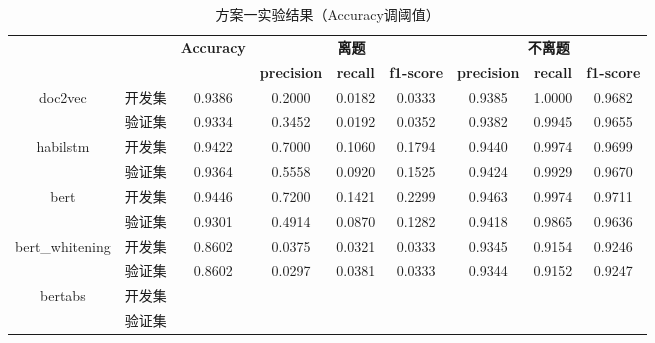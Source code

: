 \documentclass[11pt]{article}
\begin{document}
\begin{CJK}{UTF8}{gkai}
\begin{table}[htbp]\small
  \centering
  \begin{tabular}{cc|ccccccc}
    \hline
    \multicolumn{2}{c}{\multirow{2}[0]{*}{\textcolor[rgb]{ 1,  0,  0}{}}} & \multirow{2}[0]{*}{\textbf{Accuracy}} & \multicolumn{3}{c}{\textbf{离题}} & \multicolumn{3}{c}{\textbf{不离题}} \\
    \multicolumn{2}{c}{} &       & \textbf{precision} & \textbf{recall} & \textbf{f1-score} & \textbf{precision} & \textbf{recall} & \textbf{f1-score} \\
    \hline
    \multirow{2}[0]{*}{doc2vec} & 开发集   & 0.9386  & 0.2000  & 0.0182  & 0.0333  & 0.9385  & 1.0000  & 0.9682  \\
    & 验证集   & 0.9334  & 0.3452  & 0.0192  & 0.0352  & 0.9382  & 0.9945  & 0.9655  \\
    \hline
    \multirow{2}[0]{*}{habilstm} & 开发集   & 0.9422  & 0.7000  & 0.1060  & 0.1794  & 0.9440  & 0.9974  & 0.9699  \\
    & 验证集   & 0.9364  & 0.5558  & 0.0920  & 0.1525  & 0.9424  & 0.9929  & 0.9670  \\
    \hline
    \multirow{2}[0]{*}{bert} & 开发集   & 0.9446  & 0.7200  & 0.1421  & 0.2299  & 0.9463  & 0.9974  & 0.9711  \\
    & 验证集   & 0.9301  & 0.4914  & 0.0870  & 0.1282  & 0.9418  & 0.9865  & 0.9636  \\
    \hline
    \multirow{2}[0]{*}{bert\_whitening} & 开发集   & 0.8602  & 0.0375  & 0.0321  & 0.0333  & 0.9345  & 0.9154  & 0.9246  \\
    & 验证集   & 0.8602  & 0.0297  & 0.0381  & 0.0333  & 0.9344  & 0.9152  & 0.9247  \\
    \hline
    \multirow{2}[0]{*}{bertabs} & 开发集   &       &       &       &       &       &       &  \\
    & 验证集   &       &       &       &       &       &       &  \\
    \hline
  \end{tabular}%
  \caption{方案一实验结果（Accuracy调阈值）}
  \label{tab:addlabel}%
\end{table}%



\end{CJK}
\end{document}
